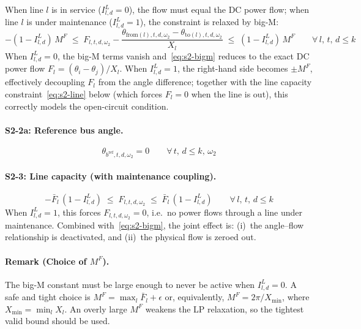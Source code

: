 \documentclass[11pt]{article}
\begin{document}
When line $l$ is in service ($I^{L}_{l,d} = 0$), the flow must
equal the DC power flow; when line $l$ is under maintenance
($I^{L}_{l,d} = 1$), the constraint is relaxed by big-M:
\begin{equation}\label{eq:s2-bigm}
\boxed{
  -(1 - I^{L}_{l,d})\, M^{F}
  \;\leq\;
  F_{l,t,d,\omega_2}
  - \frac{\theta_{\mathrm{from}(l),t,d,\omega_2}
         - \theta_{\mathrm{to}(l),t,d,\omega_2}}{X_l}
  \;\leq\;
  (1 - I^{L}_{l,d})\, M^{F}
  \qquad \forall\, l,\,t,\,d \leq k
}
\end{equation}
When $I^{L}_{l,d} = 0$, the big-M terms vanish and~\eqref{eq:s2-bigm}
reduces to the exact DC power flow $F_l = (\theta_i - \theta_j)/X_l$.
When $I^{L}_{l,d} = 1$, the right-hand side becomes $\pm M^{F}$,
effectively decoupling $F_l$ from the angle difference; together with
the line capacity constraint~\eqref{eq:s2-line} below (which forces
$F_l = 0$ when the line is out), this correctly models the open-circuit
condition.

\paragraph{S2-2a: Reference bus angle.}
\begin{equation}\label{eq:s2-ref-bus}
  \theta_{b^{\mathrm{ref}},t,d,\omega_2} = 0
  \qquad \forall\, t,\,d \leq k,\,\omega_2
\end{equation}

\paragraph{S2-3: Line capacity (with maintenance coupling).}
\begin{equation}\label{eq:s2-line}
  -\bar{F}_l\,(1 - I^{L}_{l,d})
  \;\leq\; F_{l,t,d,\omega_2} \;\leq\;
  \bar{F}_l\,(1 - I^{L}_{l,d})
  \qquad \forall\, l,\,t,\,d \leq k
\end{equation}
When $I^{L}_{l,d} = 1$, this forces $F_{l,t,d,\omega_2} = 0$, i.e.\
no power flows through a line under maintenance.  Combined
with~\eqref{eq:s2-bigm}, the joint effect is: (i)~the angle--flow
relationship is deactivated, and (ii)~the physical flow is zeroed out.

\paragraph{Remark (Choice of $M^{F}$).}
The big-M constant must be large enough to never be active when
$I^{L}_{l,d} = 0$. A safe and tight choice is
$M^{F} = \max_l \bar{F}_l + \epsilon$ or, equivalently,
$M^{F} = 2\pi / X_{\min}$, where $X_{\min} = \min_l X_l$. An
overly large $M^{F}$ weakens the LP relaxation, so the tightest
valid bound should be used.
\end{document}
